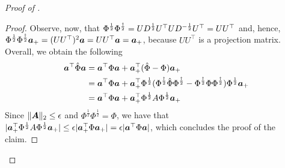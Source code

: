 \begin{proof}[Proof of ]
\begin{proof}
        Observe, now, that $\Phi^{\frac{1}{2}}\Phi^{\frac{\dagger}{2}} = UD^{\frac{1}{2}}U^\top UD^{-\frac{1}{2}}U^\top = UU^\top$ and, hence, $\Phi^{\frac{1}{2}}\Phi^{\frac{\dagger}{2}}{\bm{a}}_+ = (UU^\top)^2{\bm{a}} = UU^\top {\bm{a}} = {\bm{a}}_+$, because $UU^\top$ is a projection matrix. Overall, we obtain the following
        \begin{align*}
            {\bm{a}}^\top \hat\Phi {\bm{a}} &= {\bm{a}}^\top \Phi {\bm{a}} + {\bm{a}}_+^\top (\hat\Phi-\Phi) {\bm{a}}_+ \\
            &= {\bm{a}}^\top \Phi {\bm{a}} + {\bm{a}}_+^\top\Phi^{\frac{1}{2}} (\Phi^{\frac{\dagger}{2}}\hat\Phi\Phi^{\frac{\dagger}{2}}-\Phi^{\frac{\dagger}{2}}\Phi\Phi^{\frac{\dagger}{2}}) \Phi^{\frac{1}{2}}{\bm{a}}_+ \\
            &= {\bm{a}}^\top \Phi {\bm{a}} + {\bm{a}}_+^\top\Phi^{\frac{1}{2}} A \Phi^{\frac{1}{2}}{\bm{a}}_+
        \end{align*}
        Since $\|{\bm{A}}\|_2 \le {\epsilon}$ and $\Phi^{\frac{1}{2}}\Phi^{\frac{1}{2}} = \Phi$, we have that $|{\bm{a}}_+^\top\Phi^{\frac{1}{2}} A \Phi^{\frac{1}{2}}{\bm{a}}_+| \le {\epsilon} |{\bm{a}}_+^\top \Phi {\bm{a}}_+| = {\epsilon} |{\bm{a}}^\top \Phi {\bm{a}}|$, which concludes the proof of the claim.
    \end{proof}


\end{proof}
